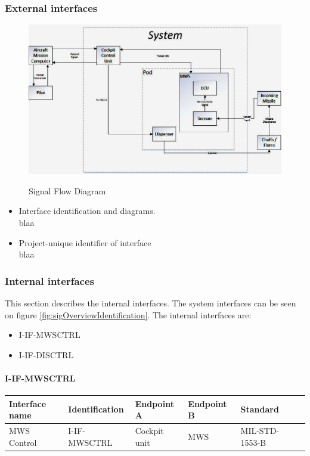 \subsubsection{External interfaces}

\begin{figure}[h]
	\centering
	\includegraphics[scale=0.5]{./images/SignalFlowDiagram}\\
	\caption{Signal Flow Diagram}
    \label{fig:sigFlowDiagram}
\end{figure}
\begin{itemize}
\item {Interface identification and diagrams.}\\
blaa
\item {Project-unique identifier of interface}\\
blaa
\end{itemize}

\subsubsection{Internal interfaces}
This section describes the internal interfaces. The system interfaces can be seen on figure \ref{fig:sigOverviewIdentification}. The internal interfaces are:

\begin{itemize}
\item I-IF-MWSCTRL
\item I-IF-DISCTRL
\end{itemize}

\paragraph{I-IF-MWSCTRL}

\begin{center}
\begin{tabular}{ | p{2cm} | l | p{1.6cm} | p{1.6cm} | l | p{1cm} |}
\hline
 \textbf{Interface name} & \textbf{Identification} & \textbf{Endpoint A} & \textbf{Endpoint B} & \textbf{Standard}\\ \hline

 MWS Control & I-IF-MWSCTRL & Cockpit unit & MWS & MIL-STD-1553-B\\ \hline

\end{tabular}
\end{center}

